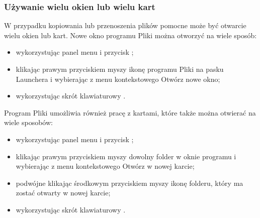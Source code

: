 \subsubsection{Używanie wielu okien lub wielu kart}
W przypadku kopiowania lub przenoszenia plików pomocne może być otwarcie wielu okien lub kart. Nowe okno programu Pliki można otworzyć na wiele sposób:
\begin{itemize}
\item wykorzystując panel menu i przycisk ;
\item klikając prawym przyciskiem myszy ikonę programu Pliki na pasku Launchera i wybierając z menu kontekstowego \textcolor{ubuntu_orange}{Otwórz nowe okno};
\item wykorzystując skrót klawiaturowy .
\end{itemize}
Program Pliki umożliwia również pracę z kartami, które także można otwierać na wiele sposobów:
\begin{itemize}
\item wykorzystując panel menu i przycisk ;
\item klikając prawym przyciskiem myszy dowolny folder w oknie programu i wybierając z menu kontekstowego \textcolor{ubuntu_orange}{Otwórz w nowej karcie};
\item podwójne klikając środkowym przyciskiem myszy ikonę folderu, który ma zostać otwarty w nowej karcie;
\item wykorzystując skrót klawiaturowy .
\end{itemize}
